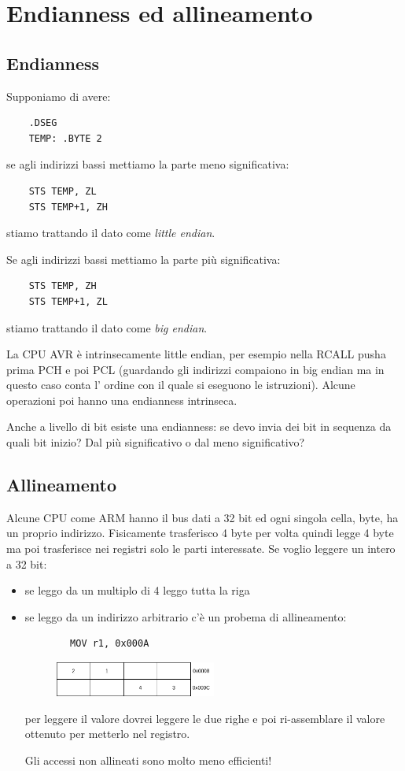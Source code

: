 \section{Endianness ed allineamento}
\subsection{Endianness}
Supponiamo di avere:
\begin{verbatim}
    .DSEG
    TEMP: .BYTE 2
\end{verbatim}
se agli indirizzi bassi mettiamo la parte meno significativa:
\begin{verbatim}
    STS TEMP, ZL
    STS TEMP+1, ZH
\end{verbatim}
stiamo trattando il dato come \emph{little endian}.

Se agli indirizzi bassi mettiamo la parte più significativa:
\begin{verbatim}
    STS TEMP, ZH
    STS TEMP+1, ZL
\end{verbatim}
stiamo trattando il dato come \emph{big endian}.

La CPU AVR è intrinsecamente little endian, per esempio nella RCALL pusha prima PCH e poi PCL (guardando gli indirizzi compaiono in big endian ma in questo caso conta l' ordine con il quale si eseguono le istruzioni).
Alcune operazioni poi hanno una endianness intrinseca.

Anche a livello di bit esiste una endianness: se devo invia dei bit in sequenza da quali bit inizio? Dal più significativo o dal meno significativo?

\subsection{Allineamento}
Alcune CPU come ARM hanno il bus dati a 32 bit ed ogni singola cella, byte, ha un proprio indirizzo.
Fisicamente trasferisco 4 byte per volta quindi legge 4 byte ma poi trasferisce nei registri solo le parti interessate.
Se voglio leggere un intero a 32 bit:
\begin{itemize}
    \item se leggo da un multiplo di 4 leggo tutta la riga
    \item se leggo da un indirizzo arbitrario c'è un probema di allineamento:
    \begin{verbatim}
        MOV r1, 0x000A
    \end{verbatim}
    \begin{figure}[H]
        \centering
        \includegraphics[width=200px]{images/14_Endianness_e_allineamento/accesso_disallineato.png}
    \end{figure}
    per leggere il valore dovrei leggere le due righe e poi ri-assemblare il valore ottenuto per metterlo nel registro.
    
    Gli accessi non allineati sono molto meno efficienti!
\end{itemize}

